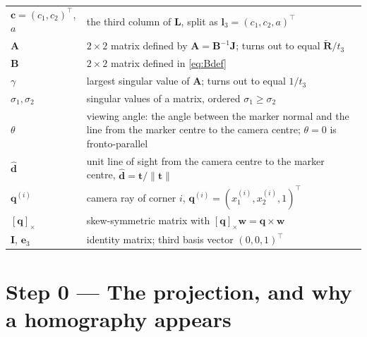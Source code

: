 \documentclass[11pt,a4paper]{article}
\theoremstyle{remark}
\newcommand{\Rtil}{\widetilde{\mathbf{R}}}
\newcommand{\Amat}{\mathbf{A}}
\newcommand{\Bmat}{\mathbf{B}}
\newcommand{\Jmat}{\mathbf{J}}
\newcommand{\Lmat}{\mathbf{L}}
\newcommand{\Idm}{\mathbf{I}}
\newcommand{\cvec}{\mathbf{c}}
\newcommand{\evec}{\mathbf{e}}
\newcommand{\lvec}{\mathbf{l}}
\newcommand{\qvec}{\mathbf{q}}
\newcommand{\tvec}{\mathbf{t}}
\newcommand{\wvec}{\mathbf{w}}
\newcommand{\dhat}{\hat{\mathbf{d}}}
\newcommand{\skewm}[1]{[#1]_{\times}}
\begin{document}
\begin{longtable}{@{}lp{11.2cm}@{}}
$\cvec = (c_1,c_2)^{\top}$, $a$ & the third column of $\Lmat$, split as
  $\lvec_3 = (c_1,c_2,a)^{\top}$ \\
$\Amat$ & $2\times2$ matrix defined by $\Amat = \Bmat^{-1}\Jmat$; turns out to
  equal $\Rtil / t_3$ \\
$\Bmat$ & $2\times2$ matrix defined in \eqref{eq:Bdef} \\
$\gamma$ & largest singular value of $\Amat$; turns out to equal $1/t_3$ \\
$\sigma_1,\sigma_2$ & singular values of a matrix, ordered
  $\sigma_1 \ge \sigma_2$ \\
$\theta$ & viewing angle: the angle between the marker normal and the line from
  the marker centre to the camera centre; $\theta = 0$ is fronto-parallel \\
$\dhat$ & unit line of sight from the camera centre to the marker centre,
  $\dhat = \tvec/\|\tvec\|$ \\
$\qvec^{(i)}$ & camera ray of corner $i$, $\qvec^{(i)} =
  (x_1^{(i)},x_2^{(i)},1)^{\top}$ \\
$\skewm{\qvec}$ & skew-symmetric matrix with
  $\skewm{\qvec}\wvec = \qvec \times \wvec$ \\
$\Idm$, $\evec_3$ & identity matrix; third basis vector $(0,0,1)^{\top}$ \\
\bottomrule
\end{longtable}

\section{Step 0 --- The projection, and why a homography appears}
\end{document}
